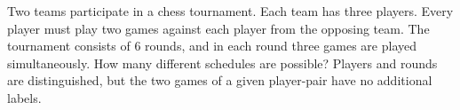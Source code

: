 Two teams participate in a chess tournament. Each team has three players. Every player must play two games against each player from the opposing team. The tournament consists of $6$ rounds, and in each round three games are played simultaneously. How many different schedules are possible?  Players and rounds are distinguished, but the two games of a given player-pair have no additional labels.
